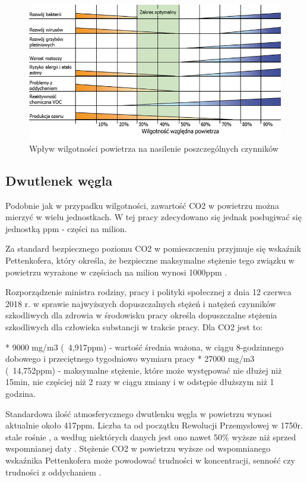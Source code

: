 \begin{figure}[!h]
    \includegraphics[width=\textwidth]{zdj/wilgotnosc_powietrza_w_pomieszczeniach.jpg}
    \caption{Wpływ wilgotności powietrza na nasilenie poszczególnych czynników}
\end{figure}

\subsection{Dwutlenek węgla}

Podobnie jak w przypadku wilgotności, zawartość CO2 w powietrzu można mierzyć w wielu jednostkach. 
W tej pracy zdecydowano się jednak posługiwać się jednostką ppm - części na milion.

Za standard bezpiecznego poziomu CO2 w pomieszczeniu przyjmuje się wskaźnik Pettenkofera, który określa, 
że bezpieczne maksymalne stężenie tego związku w powietrzu wyrażone w częściach na milion wynosi 1000ppm \cite{pettenhofer}.

Rozporządzenie ministra rodziny, pracy i polityki społecznej z dnia 12 czerwca 2018 r. w sprawie 
najwyższych dopuszczalnych stężeń i natężeń czynników szkodliwych dla zdrowia w środowisku \cite{min-stezenia} pracy określa 
dopuszczalne stężenia szkodliwych dla człowieka substancji w trakcie pracy. Dla CO2 jest to:

* 9000 mg/m3 (~4,917ppm) - wartość średnia ważona, w ciągu 8-godzinnego dobowego i przeciętnego tygodniowo wymiaru pracy
* 27000 mg/m3 (~14,752ppm) - maksymalne stężenie, które może występować nie dłużej niż 15min, nie częściej niż 2 razy w ciągu zmiany i w odstępie dłuższym niż 1 godzina.

Standardowa ilość atmosferycznego dwutlenku węgla w powietrzu wynosi aktualnie około 417ppm. 
Liczba ta od początku Rewolucji Przemysłowej w 1750r. stale rośnie \cite{atmo-co2-change}, a według niektórych danych jest 
ono nawet 50\% wyższe niż sprzed wspomnianej daty \cite{50-percent}. Stężenie CO2 w powietrzu wyższe od 
wspomnianego wskaźnika Pettenkofera może powodować trudności w koncentracji, senność czy 
trudności z oddychaniem \cite{pettenhofer}.

